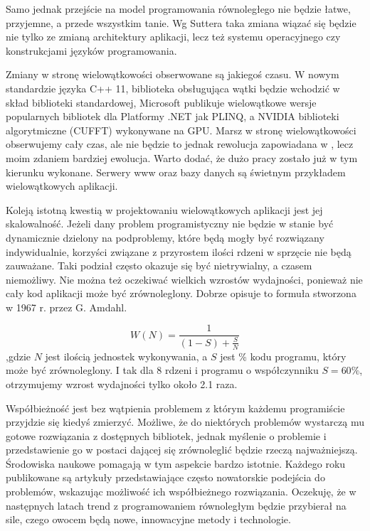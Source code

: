 Samo jednak przejście na model programowania równoległego nie będzie łatwe,
przyjemne, a przede wszystkim tanie. Wg
Suttera taka zmiana wiązać się będzie nie tylko ze zmianą architektury
aplikacji, lecz też systemu operacyjnego czy konstrukcjami języków
programowania. 

Zmiany w stronę wielowątkowości obserwowane są jakiegoś czasu. W nowym
standardzie języka C++ 11, biblioteka obsługująca wątki będzie wchodzić w skład
biblioteki standardowej, Microsoft publikuje wielowątkowe wersje popularnych
bibliotek dla Platformy .NET jak PLINQ, a NVIDIA biblioteki algorytmiczne
(CUFFT) wykonywane na GPU. Marsz w stronę wielowątkowości obserwujemy cały czas,
	ale nie będzie to jednak rewolucja zapowiadana w \cite{rewolucja}, lecz moim
	zdaniem bardziej ewolucja. Warto dodać, że dużo pracy zostało już w tym
	kierunku wykonane.
	Serwery www oraz bazy danych są świetnym przykładem wielowątkowych
	aplikacji.

Koleją istotną kwestią w projektowaniu wielowątkowych aplikacji jest jej
skalowalność. Jeżeli dany problem programistyczny nie będzie w stanie być
dynamicznie dzielony na podproblemy, które będą mogły być rozwiązany
indywidualnie, korzyści związane z przyrostem ilości rdzeni w sprzęcie nie będą
zauważane. Taki podział często okazuje się być nietrywialny, a czasem
niemożliwy. Nie można też oczekiwać wielkich wzrostów wydajności, ponieważ nie
cały kod aplikacji może być zrównoleglony. Dobrze opisuje to formuła stworzona w
1967 r. przez G. Amdahl.

\begin{equation}
W(N) = \frac{1}{(1-S) + \frac{S}{N}}
\end{equation}
,gdzie $N$ jest ilością jednostek wykonywania, a $S$ jest \% kodu programu,
	który może być zrównoleglony. I tak dla 8 rdzeni i programu o współczynniku
	$S=60\%$, otrzymujemy wzrost wydajności tylko około 2.1 raza.

Współbieżność jest bez wątpienia problemem z którym każdemu programiście
przyjdzie się kiedyś zmierzyć. Możliwe, że do niektórych problemów wystarczą mu
gotowe rozwiązania z dostępnych bibliotek, jednak myślenie o problemie i
przedstawienie go w postaci dającej się zrównoleglić będzie rzeczą
najważniejszą. Środowiska naukowe pomagają w tym aspekcie bardzo istotnie.
Każdego roku publikowane są artykuły przedstawiające często nowatorskie
podejścia do problemów, wskazując możliwość ich współbieżnego rozwiązania.
Oczekuję, że w następnych latach trend z programowaniem równoległym będzie
przybierał na sile, czego owocem będą nowe, innowacyjne metody i technologie.

